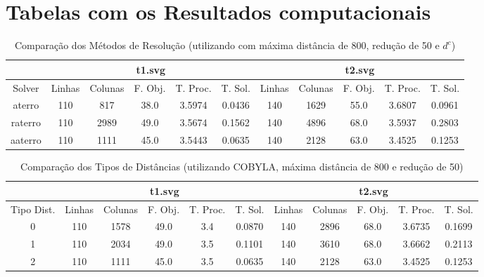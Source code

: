 \section{Tabelas com os Resultados computacionais}

\begin{landscape}
\begin{table}
    \centering
    \caption{Comparação dos Métodos de Resolução (utilizando com máxima distância de 800,
    redução de 50 e $d^c$)}
    \label{tab:solver}
    \begin{tabular}{|c|c|c|c|c|c|c|c|c|c|c|}
        \hline
        & \multicolumn{5}{|c|}{t1.svg} & \multicolumn{5}{|c|}{t2.svg} \\ \hline
        Solver & Linhas & Colunas & F. Obj. & T. Proc. & T. Sol. & Linhas &
        Colunas & F. Obj. & T. Proc. & T. Sol. \\ \hline
        aterro & 110 & 817 & 38.0 & 3.5974 & 0.0436 & 140 & 1629 & 55.0 & 3.6807 & 0.0961 \\ \hline
        raterro & 110 & 2989 & 49.0 & 3.5674 & 0.1562 & 140 & 4896 & 68.0 & 3.5937 & 0.2803 \\ \hline
        aaterro & 110 & 1111 & 45.0 & 3.5443 & 0.0635 & 140 & 2128 & 63.0 & 3.4525 & 0.1253 \\ \hline
    \end{tabular}
\end{table}

\begin{table}
    \centering
    \caption{Comparação dos Tipos de Distâncias (utilizando COBYLA, máxima
    distância de 800 e redução de 50)}
    \label{tab:dtype}
    \begin{tabular}{|c|c|c|c|c|c|c|c|c|c|c|}
        \hline
        & \multicolumn{5}{|c|}{t1.svg} & \multicolumn{5}{|c|}{t2.svg} \\ \hline
        Tipo Dist. & Linhas & Colunas & F. Obj. & T. Proc. & T. Sol. & Linhas &
        Colunas & F. Obj. & T. Proc. & T. Sol. \\ \hline
        0 & 110 & 1578 & 49.0 & 3.4 & 0.0870 & 140 & 2896 & 68.0 & 3.6735 & 0.1699 \\ \hline
        1 & 110 & 2034 & 49.0 & 3.5 & 0.1101 & 140 & 3610 & 68.0 & 3.6662 & 0.2113 \\ \hline
        2 & 110 & 1111 & 45.0 & 3.5 & 0.0635 & 140 & 2128 & 63.0 & 3.4525 & 0.1253 \\ \hline
    \end{tabular}
\end{table}


\end{landscape}
